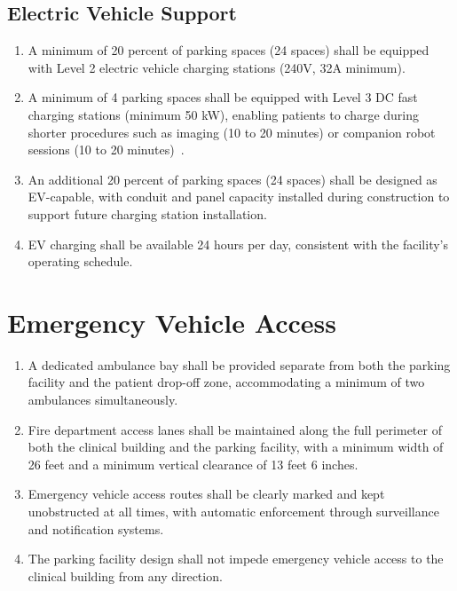 \documentclass[11pt,letterpaper]{article}
\begin{document}
\subsection{Electric Vehicle Support}

\begin{enumerate}[label=(\alph*)]
\item A minimum of 20 percent of parking spaces (24 spaces) shall be equipped
  with Level 2 electric vehicle charging stations (240V, 32A minimum).

\item A minimum of 4 parking spaces shall be equipped with Level 3 DC fast
  charging stations (minimum 50 kW), enabling patients to charge during shorter
  procedures such as imaging (10 to 20 minutes) or companion robot sessions
  (10 to 20 minutes)~\cite{patientinstructions2026}.

\item An additional 20 percent of parking spaces (24 spaces) shall be designed
  as EV-capable, with conduit and panel capacity installed during construction
  to support future charging station installation.

\item EV charging shall be available 24 hours per day, consistent with the
  facility's operating schedule.
\end{enumerate}

\section{Emergency Vehicle Access}

\begin{enumerate}[label=(\alph*)]
\item A dedicated ambulance bay shall be provided separate from both the parking
  facility and the patient drop-off zone, accommodating a minimum of two
  ambulances simultaneously.

\item Fire department access lanes shall be maintained along the full perimeter
  of both the clinical building and the parking facility, with a minimum width
  of 26 feet and a minimum vertical clearance of 13 feet 6 inches.

\item Emergency vehicle access routes shall be clearly marked and kept
  unobstructed at all times, with automatic enforcement through surveillance
  and notification systems.

\item The parking facility design shall not impede emergency vehicle access to
  the clinical building from any direction.
\end{enumerate}
\end{document}
